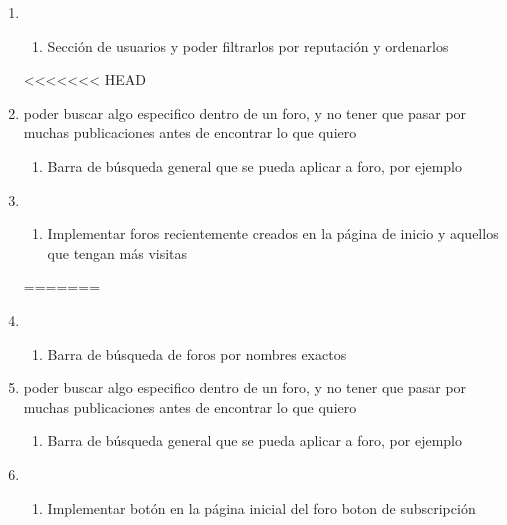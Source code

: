 \documentclass[12pt, letterpaper, notitlepage]{article}
\begin{document}
\begin{enumerate}
\begin{enumerate}
		
		\item {}
		\begin{enumerate}
			\item Sección de usuarios y poder filtrarlos por reputación y ordenarlos
		\end{enumerate}
<<<<<<< HEAD

    
    \item {}
    {poder buscar algo especifico dentro de un foro, y no tener que pasar por muchas publicaciones antes de encontrar lo que quiero}
    	\begin{enumerate}
			\item Barra de búsqueda general que se pueda aplicar a foro, por ejemplo 
		\end{enumerate}

    
    \item {}
    	\begin{enumerate}
            \item Implementar foros recientemente creados en la página de inicio y aquellos que tengan más visitas
		\end{enumerate}

=======
		
		
		\item {}
		\begin{enumerate}
			\item Barra de búsqueda de foros por nombres exactos
		\end{enumerate}
		
		
		\item {}
		{poder buscar algo especifico dentro de un foro, y no tener que pasar por muchas publicaciones antes de encontrar lo que quiero}
		\begin{enumerate}
			\item Barra de búsqueda general que se pueda aplicar a foro, por ejemplo 
		\end{enumerate}
		
		
		\item {}
		\begin{enumerate}
			\item Implementar botón en la página inicial del foro boton de subscripción
		\end{enumerate}
		

\end{enumerate}
\end{enumerate}
\end{document}
